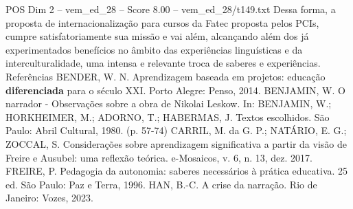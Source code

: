 \begin{textsample}{POS Dim 2 – vem\_ed\_28 – Score 8.00 – vem\_ed\_28/t149.txt}
Dessa forma, a proposta de internacionalização para cursos da Fatec proposta pelos PCIs, cumpre satisfatoriamente sua missão e vai além, alcançando além dos já experimentados benefícios no âmbito das experiências linguísticas e da interculturalidade, uma intensa e relevante troca de saberes e experiências.
Referências BENDER, W.
N.
Aprendizagem baseada em projetos: educação \textbf{diferenciada} para o século XXI.
Porto Alegre: Penso, 2014.
BENJAMIN, W.
O narrador - Observações sobre a obra de Nikolai Leskow.
In: BENJAMIN, W.; HORKHEIMER, M.; ADORNO, T.; HABERMAS, J.
Textos escolhidos.
São Paulo: Abril Cultural, 1980. (p. 57-74) CARRIL, M. da G.
P.; NATÁRIO, E.
G.; ZOCCAL, S.
Considerações sobre aprendizagem significativa a partir da visão de Freire e Ausubel: uma reflexão teórica. e-Mosaicos, v. 6, n. 13, dez. 2017.
FREIRE, P.
Pedagogia da autonomia: saberes necessários à prática educativa. 25 ed.
São Paulo: Paz e Terra, 1996.
HAN, B.-C.
A crise da narração.
Rio de Janeiro: Vozes, 2023.

\end{textsample}
